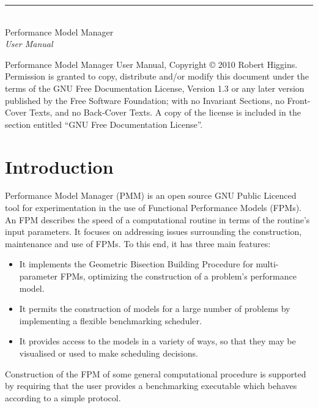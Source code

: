 \documentclass[a4paper,12pt]{report}
\begin{document}
    \pagestyle{empty}
    \vspace*{15cm}
    \begin{flushright}
        \rule[-1ex]{11cm}{3pt}\\
        \huge Performance Model Manager\\
        \huge \emph{User Manual}\\
    \end{flushright}

    \newpage


    \noindent

    \begin{boxedminipage}[b]{\textwidth}
    Performance Model Manager User Manual,
    Copyright \copyright{} 2010 Robert Higgins.
    Permission is granted to copy, distribute and/or modify this document
    under the \\ terms of the GNU Free Documentation License, Version 1.3
    or any later version published by the Free Software Foundation;
    with no Invariant Sections, no Front-Cover Texts, and no Back-Cover Texts.
    A copy of the license is included in the section entitled ``GNU
    Free Documentation License''.
    \end{boxedminipage}

    \newpage

    \tableofcontents


    \chapter{Introduction}

    Performance Model Manager (PMM) is an open source GNU Public Licenced tool
    for experimentation in the use of Functional Performance Models (FPMs). An
    FPM describes the speed of a computational routine in terms of the
    routine's input parameters. It focuses on addressing issues surrounding the
    construction, maintenance and use of FPMs. To this end, it has three main
    features:
    \begin{itemize}
        \item It implements the Geometric Bisection Building Procedure for
            multi-parameter FPMs, optimizing the construction of a problem's
            performance model. 
        \item It permits the construction of models for a large number of
            problems by implementing a flexible benchmarking scheduler.
        \item It provides access to the models in a variety of ways, so that
            they may be visualised or used to make scheduling decisions.
    \end{itemize}
    Construction of the FPM of some general computational procedure is supported
    by requiring that the user provides a benchmarking executable which behaves
    according to a simple protocol.
    
\end{document}
